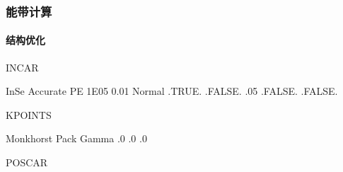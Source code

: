 \documentclass[a4paper,12pt,english]{sphinxmanual}
\begin{document}
\subsubsection{能带计算}
\label{\detokenize{tutorials/vasp/mobility:id6}}

\paragraph{结构优化}
\label{\detokenize{tutorials/vasp/mobility:id7}}
\begin{DUlineblock}{0em}
\item[] INCAR
\end{DUlineblock}

\begin{sphinxVerbatim}[commandchars=\\\{\}]
  InSe
  
  
    Accurate
   
     PE
     
    
    
  
    
   1E\PYGZhy{}05
  \PYGZhy{}0.01
    Normal
   .TRUE.
   .FALSE.
  
   .05
  
    .FALSE.
  .FALSE.
    
\end{sphinxVerbatim}

\begin{DUlineblock}{0em}
\item[] KPOINTS
\end{DUlineblock}

\begin{sphinxVerbatim}[commandchars=\\\{\}]
Monkhorst Pack
Gamma
       
.0   .0   .0
\end{sphinxVerbatim}

\begin{DUlineblock}{0em}
\item[] POSCAR
\end{DUlineblock}
\end{document}

